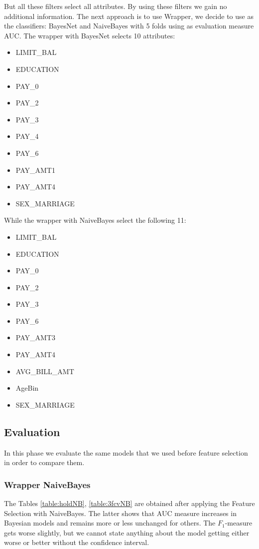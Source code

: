 \documentclass[fleqn,10pt]{SelfArx} %
\begin{document}
But all these filters select all attributes. By using these filters we gain no additional information.
The next approach is to use Wrapper, we decide to use as the classifiers: BayesNet and NaiveBayes with 5 folds using as evaluation measure AUC.
The wrapper with BayesNet selects 10 attributes:
\begin{itemize}[noitemsep]
\item LIMIT\_BAL
\item EDUCATION
\item PAY\_0
\item PAY\_2
\item PAY\_3
\item PAY\_4
\item PAY\_6
\item PAY\_AMT1
\item PAY\_AMT4
\item SEX\_MARRIAGE
\end{itemize}
While the wrapper with NaiveBayes select the following 11:
\begin{itemize}[noitemsep]
	\item LIMIT\_BAL
	\item EDUCATION
	\item PAY\_0
	\item PAY\_2
	\item PAY\_3
	\item PAY\_6
	\item PAY\_AMT3
	\item PAY\_AMT4
	\item AVG\_BILL\_AMT
	\item AgeBin
	\item SEX\_MARRIAGE
\end{itemize}


\subsection{Evaluation}
In this phase we evaluate the same models that we used before feature selection in order to compare them.

\subsubsection{Wrapper NaiveBayes}
The Tables \ref{table:holdNB}, \ref{table:3fcvNB} are obtained after applying the Feature Selection with NaiveBayes. 
The latter shows that AUC measure increases in Bayesian models and remains more or less unchanged for others. 
The $F_1$-measure gets worse slightly, but we cannot state anything about the model getting either worse or better without the confidence interval.
\end{document}
